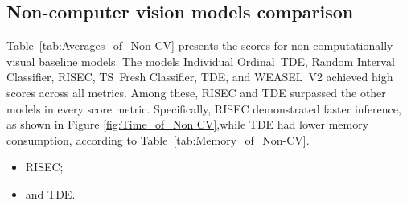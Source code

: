 





\FloatBarrier

\subsection{Non-computer vision models comparison}


Table~\ref{tab:Averages_of_Non-CV} presents the scores for non-computationally-visual baseline models. The models Individual \mbox{Ordinal TDE}, Random Interval Classifier, \gls{RISEC}, \mbox{TS Fresh} Classifier, \gls{TDE}, and \mbox{WEASEL V2} achieved high scores across all metrics. Among these, \gls{RISEC} and \gls{TDE} surpassed the other models in every score metric. Specifically, \gls{RISEC} demonstrated faster inference, as shown in Figure \ref{fig:Time_of_Non CV},while \gls{TDE} had lower memory consumption, according to Table~\ref{tab:Memory_of_Non-CV}.  
\begin{itemize}
	\item \gls{RISEC};
	\item and \gls{TDE}.
\end{itemize}


